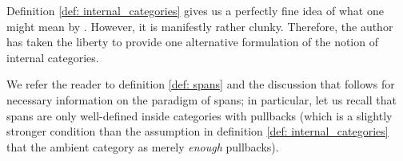                     \begin{remark} \label{remark: internal_categories_alt_def}
                        Definition \ref{def: internal_categories} gives us a perfectly fine idea of what one might mean by . However, it is manifestly rather clunky. Therefore, the author has taken the liberty to provide one alternative formulation of the notion of internal categories.
                        
                        We refer the reader to definition \ref{def: spans} and the discussion that follows for necessary information on the paradigm of spans; in particular, let us recall that spans are only well-defined inside categories with pullbacks (which is a slightly stronger condition than the assumption in definition \ref{def: internal_categories} that the ambient category as merely \textit{enough} pullbacks). 
                            

\end{remark}
